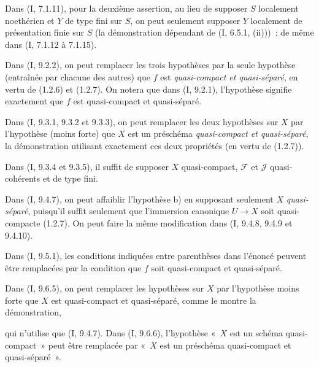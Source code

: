 \begin{env}[1.7.3]
\label{IV.1.7.3-fr}
Dans (I, 7.1.11), pour la deuxième assertion, au lieu de supposer $S$
localement noethérien et $Y$ de type fini sur $S$, on peut seulement supposer
$Y$ localement de présentation finie sur $S$ (la démonstration dépendant de
(I, 6.5.1, (ii)))~; de même dans (I, 7.1.12 à 7.1.15).
\end{env}

\begin{env}[1.7.4]
\label{IV.1.7.4-fr}
Dans (I, 9.2.2), on peut remplacer les trois hypothèses par la seule hypothèse
(entraînée par chacune des autres) que $f$ est \emph{quasi-compact et
quasi-séparé}, en vertu de (1.2.6) et (1.2.7). On notera que dans (I, 9.2.1),
l'hypothèse signifie exactement que $f$ est quasi-compact et quasi-séparé.
\end{env}

\begin{env}[1.7.5]
\label{IV.1.7.5-fr}
Dans (I, 9.3.1, 9.3.2 et 9.3.3), on peut remplacer les deux hypothèses sur $X$
par l'hypothèse (moins forte) que $X$ est un préschéma \emph{quasi-compact et
quasi-séparé}, la démonstration utilisant exactement ces deux propriétés (en
vertu de (1.2.7)).
\end{env}

\begin{env}[1.7.6]
\label{IV.1.7.6-fr}
Dans (I, 9.3.4 et 9.3.5), il suffit de supposer $X$ quasi-compact,
$\mathcal F$ et $\mathcal J$ quasi-cohérents et de type fini.
\end{env}

\begin{env}[1.7.7]
\label{IV.1.7.7-fr}
Dans (I, 9.4.7), on peut affaiblir l'hypothèse b) en supposant seulement $X$
\emph{quasi-séparé}, puisqu'il suffit seulement que l'immersion canonique
$U\to X$ soit quasi-compacte (1.2.7). On peut faire la même modification dans
(I, 9.4.8, 9.4.9 et 9.4.10).
\end{env}

\begin{env}[1.7.8]
\label{IV.1.7.8-fr}
Dans (I, 9.5.1), les conditions indiquées entre parenthèses dans l'énoncé
peuvent être remplacées par la condition que $f$ soit quasi-compact et
quasi-séparé.
\end{env}

\begin{env}[1.7.9]
\label{IV.1.7.9-fr}
Dans (I, 9.6.5), on peut remplacer les hypothèses sur $X$ par l'hypothèse
moins forte que $X$ est quasi-compact et quasi-séparé, comme le montre la
démonstration,


qui n'utilise que (I, 9.4.7). Dans (I, 9.6.6), l'hypothèse «~$X$ est un
schéma quasi-compact~» peut être remplacée par «~$X$ est un préschéma
quasi-compact et quasi-séparé~».
\end{env}

